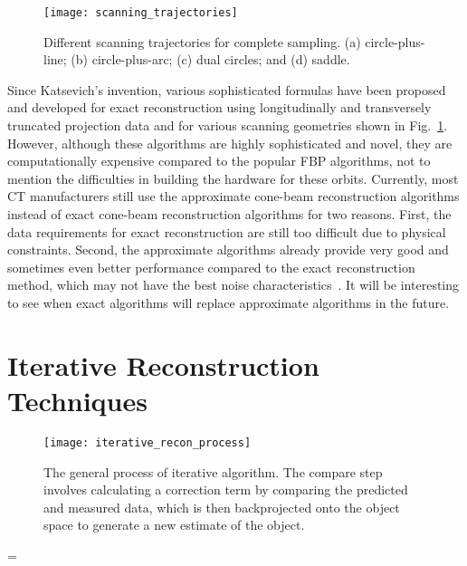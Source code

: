 \begin{figure}[h]
\texttt{[image: scanning\_trajectories]}
\caption{Different scanning trajectories for complete sampling. (a) circle-plus-line; (b) circle-plus-arc; (c) dual circles; and (d) saddle.}
\label{fig:scanning_trajectories}
\end{figure}

Since Katsevich's invention, various sophisticated formulas have been proposed and developed for exact reconstruction using longitudinally and transversely truncated projection data and for various scanning geometries shown in Fig.~\ref{fig:scanning_trajectories}.  However, although these algorithms are highly sophisticated and novel, they are computationally expensive compared to the popular FBP algorithms, not to mention the difficulties in building the hardware for these orbits.  Currently, most CT manufacturers still use the approximate cone-beam reconstruction algorithms instead of exact cone-beam reconstruction algorithms for two reasons.  First, the data requirements for exact reconstruction are still too difficult due to physical constraints.  Second, the approximate algorithms already provide very good and sometimes even better performance compared to the exact reconstruction method, which may not have the best noise characteristics~\citep{Wang2008}.  It will be interesting to see when exact algorithms will replace approximate algorithms in the future.

\section{Iterative Reconstruction Techniques}

\begin{figure}[ht]
\begin{minipage}{\linewidth}
\centering
\texttt{[image: iterative\_recon\_process]}
\end{minipage}
\caption[The general process of iterative algorithm.]{The general process of iterative algorithm\footnotemark.  The compare step involves calculating a correction term by comparing the predicted and measured data, which is then backprojected onto the object space to generate a new estimate of the object.}
\label{fig:generalIR}
\end{figure}
\skip\footins=\bigskipamount
{}


